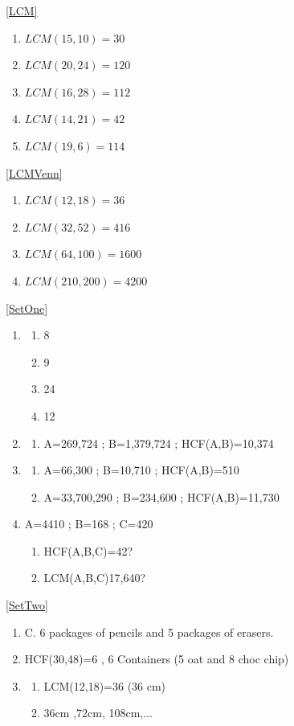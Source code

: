 \documentclass[a4paper,12pt]{article}
\begin{document}
\ref{LCM}
\begin{multicols}{5}
	\begin{enumerate}[label= \roman*)]
		\item $LCM(15,10)=30$
		\item $LCM(20,24)=120$ 
		\item $LCM(16,28)=112$
		\item $LCM(14,21)=42$  
		\item $LCM(19,6)=114$
	\end{enumerate}
\end{multicols}
\ref{LCMVenn}
\begin{multicols}{4}
	\begin{enumerate}[label= \roman*)]
		\item $LCM(12,18)=36$
		\item $LCM(32,52)=416$ 
		\item $LCM(64,100)=1600$
		\item $LCM(210,200)=4200$  
	\end{enumerate}
\end{multicols}
\ref{SetOne}
\begin{enumerate}
	\item 
	\begin{enumerate}
		\item 8
		\item 9
		\item 24
		\item 12
	\end{enumerate}
	\item
	\begin{enumerate}
		\item  A=269,724 ; B=1,379,724 ; HCF(A,B)=10,374
	\end{enumerate}
	\item
	\begin{enumerate}
		\item A=66,300 ; B=10,710 ; HCF(A,B)=510
		\item A=33,700,290 ; B=234,600 ; HCF(A,B)=11,730
	\end{enumerate}
	\item A=4410 ; B=168 ; C=420
	\begin{enumerate}
		\item  HCF(A,B,C)=42?
		\item  LCM(A,B,C)17,640?
	\end{enumerate}
\end{enumerate}
\ref{SetTwo}
\begin{enumerate}
	\item C. 6 packages of pencils and 5 packages of erasers.
	\item HCF(30,48)=6 , 6 Containers (5 oat and 8 choc chip)
	\item 
	\begin{enumerate}
		\item LCM(12,18)=36   (36 cm)
		\item 36cm ,72cm, 108cm,...
	\end{enumerate}
\end{enumerate}
\end{document}
